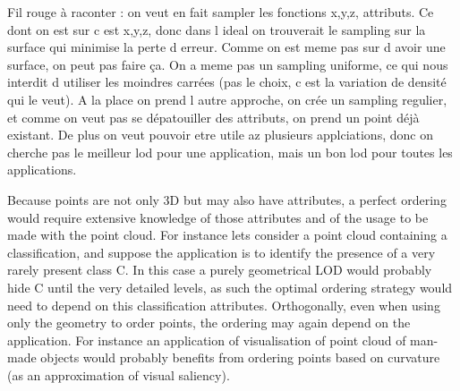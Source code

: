         
        
        
        
    
	    
	    
	 
        Fil rouge à raconter : on veut en fait sampler les fonctions x,y,z, attributs.
        Ce dont on est sur c est x,y,z, donc dans l ideal on trouverait le sampling sur la surface qui minimise la perte d erreur. Comme on est meme pas sur d avoir une surface, on peut pas faire ça. On a meme pas un sampling uniforme, ce qui nous interdit d utiliser les moindres carrées (pas le choix, c est la variation de densité qui le veut).
        A la place on prend l autre approche, on crée un sampling regulier, et comme on veut pas se dépatouiller des attributs, on prend un point déjà existant.
        De plus on veut pouvoir etre utile az plusieurs applciations, donc on cherche pas le meilleur lod pour une application, mais un bon lod pour toutes les applications.
       
        
        Because points are not only 3D but may also have attributes, a perfect ordering would require extensive knowledge of those attributes and of the usage to be made with the point cloud.
        For instance lets consider a point cloud containing a classification, and suppose the application is to identify the presence of a very rarely present class C.
        In this case a purely geometrical LOD would probably hide C until the very detailed levels, as such the optimal ordering strategy would need to depend on this classification attributes.
        Orthogonally, even when using only the geometry to order points, the ordering may again depend on the application. For instance an application of visualisation of point cloud of man-made objects would probably benefits from ordering points based on curvature (as an approximation of visual saliency).
        
